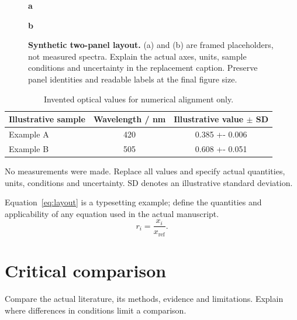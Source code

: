 \documentclass[a4paper,preprint,12pt]{elsarticle}
\begin{document}
\begin{figure}[htbp]
\centering
\begin{minipage}[t]{0.47\linewidth}
\centering\textbf{a}\par\smallskip
{}
\end{minipage}\hfill
\begin{minipage}[t]{0.47\linewidth}
\centering\textbf{b}\par\smallskip
{}
\end{minipage}
\caption{\textbf{Synthetic two-panel layout.} (a) and (b) are framed
placeholders, not measured spectra. Explain the actual axes, units, sample
conditions and uncertainty in the replacement caption. Preserve panel
identities and readable labels at the final figure size.}
\label{fig:spectra}
\end{figure}
\begin{table}[htbp]
\centering\small
\caption{Invented optical values for numerical alignment only.}
\label{tab:values}
\begin{tabularx}{\linewidth}{@{}>{\raggedright\arraybackslash}X
 S[table-format=3.0] S[table-format=1.3(3)]@{}}
\toprule
Illustrative sample & {Wavelength / nm} & {Illustrative value $\pm$ SD}\\
\midrule
Example A & 420 & 0.385 +- 0.006\\
Example B & 505 & 0.608 +- 0.051\\
\bottomrule
\end{tabularx}
\par\smallskip\footnotesize\raggedright
No measurements were made. Replace all values and specify actual quantities,
units, conditions and uncertainty. SD denotes an illustrative standard deviation.
\end{table}

Equation~\eqref{eq:layout} is a typesetting example; define the quantities
and applicability of any equation used in the actual manuscript.
\begin{equation}
 r_i = \frac{x_i}{x_{\mathrm{ref}}}.\label{eq:layout}
\end{equation}

\section{Critical comparison}\label{sec:comparison}
Compare the actual literature, its methods, evidence and limitations.
Explain where differences in conditions limit a comparison.
\end{document}
